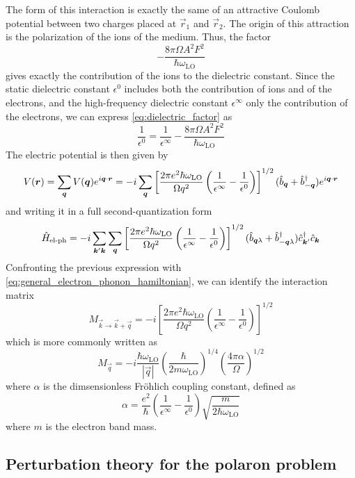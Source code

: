 The form of this interaction is exactly the same of an attractive Coulomb potential between two charges placed at $\vec{r}_1$ and $\vec{r}_2$. The origin of this attraction is the polarization of the ions of the medium. Thus, the factor
\begin{equation} \label{eq:dielectric_factor}
    - \frac{8\pi \Omega A^2 F^2}{\hbar \omega_\text{LO}}
\end{equation}
gives exactly the contribution of the ions to the dielectric constant. Since the static dielectric constant $\epsilon^0$ includes both the contribution of ions and of the electrons, and the high-frequency dielectric constant $\epsilon^\infty$ only the contribution of the electrons, we can express \cref{eq:dielectric_factor} as
\begin{equation}
    \frac{1}{\epsilon^0} = \frac{1}{\epsilon^\infty} - \frac{8\pi \Omega A^2 F^2}{\hbar \omega_\text{LO}}
\end{equation}
The electric potential is then given by
\begin{equation}
    V(\mathbf{\boldsymbol{r}}) = \sum_{\mathbf{\boldsymbol{q}}} V(\mathbf{\boldsymbol{q}}) e^{i\mathbf{\boldsymbol{q}} \cdot \mathbf{\boldsymbol{r}}}
    = -i \sum_{\mathbf{\boldsymbol{q}}} \left[ \frac{2\pi e^2 \hbar \omega_\text{LO}}{\Omega q^2} \left( \frac{1}{\epsilon^\infty} - \frac{1}{\epsilon^0} \right) \right]^{1/2} (\hat{b}_{\mathbf{\boldsymbol{q}}} + \hat{b}^\dagger_{-\mathbf{\boldsymbol{q}}}) e^{i\mathbf{\boldsymbol{q}}\cdot\mathbf{\boldsymbol{r}}}
\end{equation}
and writing it in a full second-quantization form
\begin{equation}
    \hat{H}_\text{el-ph} = -i \sum_{\mathbf{\boldsymbol{k}}'\mathbf{\boldsymbol{k}}} \sum_{\mathbf{\boldsymbol{q}}} \left[ \frac{2\pi e^2 \hbar \omega_\text{LO}}{\Omega q^2} \left( \frac{1}{\epsilon^\infty} - \frac{1}{\epsilon^0} \right) \right]^{1/2}(\hat{b}_{\mathbf{\boldsymbol{q}}\lambda} + \hat{b}^\dagger_{-\mathbf{\boldsymbol{q}}\lambda}) \hat{c}^\dagger_{\mathbf{\boldsymbol{k}}'}\hat{c}_{\mathbf{\boldsymbol{k}}}
\end{equation}
Confronting the previous expression with \cref{eq:general_electron_phonon_hamiltonian}, we can identify the interaction matrix
\begin{equation}
    M_{\vec{k} \rightarrow \vec{k} + \vec{q}} = -i \left[ \frac{2\pi e^2 \hbar \omega_\text{LO}}{\Omega q^2} \left( \frac{1}{\epsilon^\infty} - \frac{1}{\epsilon^0} \right) \right]^{1/2}
\end{equation}
which is more commonly written as
\begin{equation}
    M_\vec{q} = -i \frac{\hbar \omega_\text{LO}}{|\vec{q}|} \left(\frac{\hbar}{2m\omega_\text{LO}}\right)^{1/4} \left(\frac{4\pi\alpha}{\Omega}\right)^{1/2}
\end{equation}
where $\alpha$ is the dimsensionless Fr\"{o}hlich coupling constant,  defined as
\begin{equation}
    \alpha = \frac{e^2}{\hbar} \left( \frac{1}{\epsilon^\infty} - \frac{1}{\epsilon^0} \right) \sqrt{\frac{m}{2\hbar\omega_\text{LO}}}
\end{equation}
where $m$ is the electron band mass.

\subsection{Perturbation theory for the polaron problem}